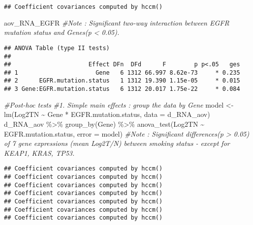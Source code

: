 \documentclass[
]{article}
\newenvironment{Shaded}{\begin{snugshade}}{\end{snugshade}}
\newcommand{\AttributeTok}[1]{\textcolor[rgb]{0.77,0.63,0.00}{#1}}
\newcommand{\CommentTok}[1]{\textcolor[rgb]{0.56,0.35,0.01}{\textit{#1}}}
\newcommand{\FunctionTok}[1]{\textcolor[rgb]{0.00,0.00,0.00}{#1}}
\newcommand{\NormalTok}[1]{#1}
\newcommand{\OtherTok}[1]{\textcolor[rgb]{0.56,0.35,0.01}{#1}}
\newcommand{\SpecialCharTok}[1]{\textcolor[rgb]{0.00,0.00,0.00}{#1}}
\begin{document}
\begin{verbatim}
## Coefficient covariances computed by hccm()
\end{verbatim}

\begin{Shaded}
\begin{Highlighting}[]
\NormalTok{aov\_RNA\_EGFR }\CommentTok{\#Note : Significant two{-}way interaction between EGFR mutation status and Genes(p \textless{} 0.05).}
\end{Highlighting}
\end{Shaded}

\begin{verbatim}
## ANOVA Table (type II tests)
## 
##                      Effect DFn  DFd      F        p p<.05   ges
## 1                      Gene   6 1312 66.997 8.62e-73     * 0.235
## 2      EGFR.mutation.status   1 1312 19.390 1.15e-05     * 0.015
## 3 Gene:EGFR.mutation.status   6 1312 20.017 1.75e-22     * 0.084
\end{verbatim}

\begin{Shaded}
\begin{Highlighting}[]
\CommentTok{\#Post{-}hoc tests}
\CommentTok{\#1. Simple main effects : group the data by Gene}
\NormalTok{model }\OtherTok{\textless{}{-}} \FunctionTok{lm}\NormalTok{(Log2TN }\SpecialCharTok{\textasciitilde{}}\NormalTok{ Gene }\SpecialCharTok{*}\NormalTok{ EGFR.mutation.status, }\AttributeTok{data =}\NormalTok{ d\_RNA\_aov)}
\NormalTok{d\_RNA\_aov }\SpecialCharTok{\%\textgreater{}\%}
  \FunctionTok{group\_by}\NormalTok{(Gene) }\SpecialCharTok{\%\textgreater{}\%}
  \FunctionTok{anova\_test}\NormalTok{(Log2TN }\SpecialCharTok{\textasciitilde{}}\NormalTok{ EGFR.mutation.status, }\AttributeTok{error =}\NormalTok{ model) }\CommentTok{\#Note : Significant differences(p \textgreater{} 0.05) of 7 gene expressions (mean Log2T/N) between smoking status {-} except for KEAP1, KRAS, TP53.}
\end{Highlighting}
\end{Shaded}

\begin{verbatim}
## Coefficient covariances computed by hccm()
## Coefficient covariances computed by hccm()
## Coefficient covariances computed by hccm()
## Coefficient covariances computed by hccm()
## Coefficient covariances computed by hccm()
## Coefficient covariances computed by hccm()
## Coefficient covariances computed by hccm()
\end{verbatim}
\end{document}
